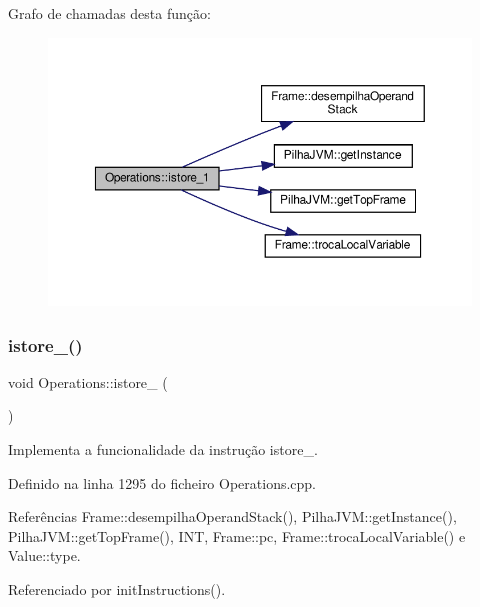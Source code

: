 Grafo de chamadas desta função\+:\nopagebreak
\begin{figure}[H]
\begin{center}
\leavevmode
\includegraphics[width=350pt]{classOperations_aeb89677195b16d5c595ec9faaddc2c76_cgraph}
\end{center}
\end{figure}
\mbox{\label{classOperations_a0fbc901b4c88aef8455b30d9b2063447}} 
\subsubsection{\texorpdfstring{istore\+\_()}{istore\_2()}}
{\footnotesize\ttfamily void Operations\+::istore\+\_ (\begin{DoxyParamCaption}{ }\end{DoxyParamCaption})\hspace{0.3cm}{\ttfamily [private]}}



Implementa a funcionalidade da instrução istore\+\_. 



Definido na linha 1295 do ficheiro Operations.\+cpp.



Referências Frame\+::desempilha\+Operand\+Stack(), Pilha\+J\+V\+M\+::get\+Instance(), Pilha\+J\+V\+M\+::get\+Top\+Frame(), I\+NT, Frame\+::pc, Frame\+::troca\+Local\+Variable() e Value\+::type.



Referenciado por init\+Instructions().


